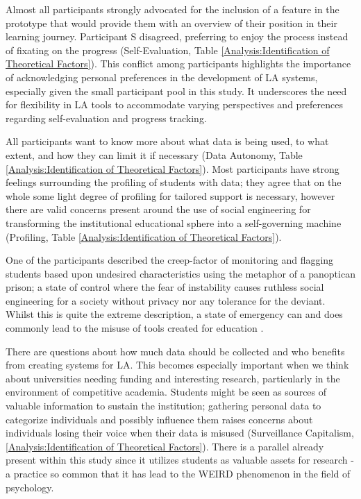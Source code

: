 \documentclass{l4proj}
\begin{document}
Almost all participants strongly advocated for the inclusion of a feature in the prototype that would provide them with an overview of their position in their learning journey. Participant S disagreed, preferring to enjoy the process instead of fixating on the progress (Self-Evaluation, Table \ref{Analysis:Identification of Theoretical Factors}). This conflict among participants highlights the importance of acknowledging personal preferences in the development of LA systems, especially given the small participant pool in this study. It underscores the need for flexibility in LA tools to accommodate varying perspectives and preferences regarding self-evaluation and progress tracking. 

All participants want to know more about what data is being used, to what extent, and how they can limit it if necessary (Data Autonomy, Table \ref{Analysis:Identification of Theoretical Factors}). Most participants have strong feelings surrounding the profiling of students with data; they agree that on the whole some light degree of profiling for tailored support is necessary, however there are valid concerns present around the use of social engineering for transforming the institutional educational sphere into a self-governing machine (Profiling, Table \ref{Analysis:Identification of Theoretical Factors}). 

One of the participants described the creep-factor of monitoring and flagging students based upon undesired characteristics using the metaphor of a panoptican prison; a state of control where the fear of instability causes ruthless social engineering for a society without privacy nor any tolerance for the deviant. Whilst this is quite the extreme description, a state of emergency can and does commonly lead to the misuse of tools created for education \citep{wilson1989consequential}. 

There are questions about how much data should be collected and who benefits from creating systems for LA. This becomes especially important when we think about universities needing funding and interesting research, particularly in the environment of competitive academia. Students might be seen as sources of valuable information to sustain the institution; gathering personal data to categorize individuals and possibly influence them raises concerns about individuals losing their voice when their data is misused (Surveillance Capitalism, \ref{Analysis:Identification of Theoretical Factors}). There is a parallel already present within this study since it utilizes students as valuable assets for research - a practice so common that it has lead to the WEIRD phenomenon in the field of psychology. 
\end{document}

